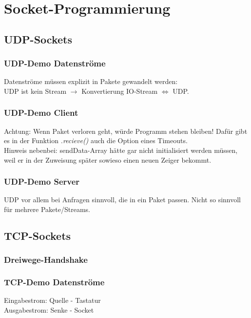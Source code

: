 \section{Socket-Programmierung}
\subsection{UDP-Sockets}
\subsubsection{UDP-Demo Datenströme}
Datenströme müssen explizit in Pakete gewandelt werden:\\
UDP ist kein Stream $\to$ Konvertierung IO-Stream $\Leftrightarrow$ UDP.
\subsubsection{UDP-Demo Client}
Achtung: Wenn Paket verloren geht, würde Programm stehen bleiben! Dafür gibt es in der Funktion \emph{.recieve()} auch die Option eines Timeouts.\\
Hinweis nebenbei: sendData-Array hätte gar nicht initialisiert werden müssen, weil er in der Zuweisung später sowieso einen neuen Zeiger bekommt.
\subsubsection{UDP-Demo Server}
UDP vor allem bei Anfragen sinnvoll, die in ein Paket passen. Nicht so sinnvoll für mehrere Pakete/Streams.

\subsection{TCP-Sockets}
\subsubsection*{Dreiwege-Handshake}
\subsubsection{TCP-Demo Datenströme}
Eingabestrom: Quelle - Tastatur\\
Ausgabestrom: Senke - Socket
